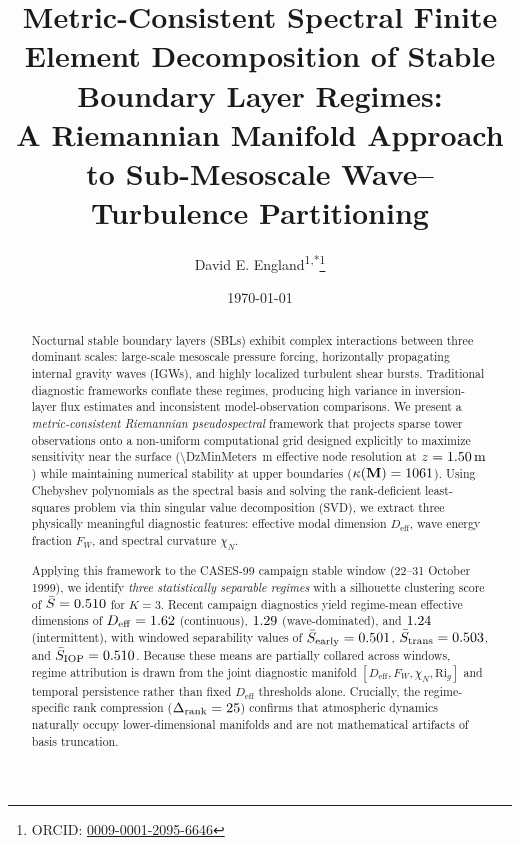 \documentclass[11pt,a4paper]{article}
\title{Metric-Consistent Spectral Finite Element Decomposition of Stable Boundary Layer Regimes: \\
A Riemannian Manifold Approach to Sub-Mesoscale Wave--Turbulence Partitioning}
\author{David E. England\textsuperscript{1,*}\thanks{ORCID: \href{https://orcid.org/0009-0001-2095-6646}{0009-0001-2095-6646}}}
\affil{\textsuperscript{1}The University of Alabama in Huntsville, 301 Sparkman Drive, Huntsville, AL 35899, USA}
\affil{\textsuperscript{*}Corresponding author: David.England@UAH.Edu}
\date{\today}
\begin{document}
\maketitle


\begin{abstract}
Nocturnal stable boundary layers (SBLs) exhibit complex interactions between three dominant scales: large-scale mesoscale pressure forcing, horizontally propagating internal gravity waves (IGWs), and highly localized turbulent shear bursts. Traditional diagnostic frameworks conflate these regimes, producing high variance in inversion-layer flux estimates and inconsistent model-observation comparisons. We present a \emph{metric-consistent Riemannian pseudospectral} framework that projects sparse tower observations onto a non-uniform computational grid designed explicitly to maximize sensitivity near the surface (\SI{\DzMinMeters}{\meter} effective node resolution at $z = \SI{1.50}{\meter}$) while maintaining numerical stability at upper boundaries ($\kappa(\mathbf{M}) = 1061$). Using Chebyshev polynomials as the spectral basis and solving the rank-deficient least-squares problem via thin singular value decomposition (SVD), we extract three physically meaningful diagnostic features: effective modal dimension $D_{\mathrm{eff}}$, wave energy fraction $F_W$, and spectral curvature $\chi_N$.

Applying this framework to the CASES-99 campaign stable window (22--31 October 1999), we identify \emph{three statistically separable regimes} with a silhouette clustering score of $\bar{S} = 0.510$ for $K=3$. Recent campaign diagnostics yield regime-mean effective dimensions of $D_{\mathrm{eff}}=1.62$ (continuous), $1.29$ (wave-dominated), and $1.24$ (intermittent), with windowed separability values of $\bar{S}_{\mathrm{early}}=0.501$, $\bar{S}_{\mathrm{trans}}=0.503$, and $\bar{S}_{\mathrm{IOP}}=0.510$. Because these means are partially collared across windows, regime attribution is drawn from the joint diagnostic manifold $[D_{\mathrm{eff}}, F_W, \chi_N, \mathrm{Ri}_g]$ and temporal persistence rather than fixed $D_{\mathrm{eff}}$ thresholds alone. Crucially, the regime-specific rank compression ($\Delta_{\mathrm{rank}} = 25$) confirms that atmospheric dynamics naturally occupy lower-dimensional manifolds and are not mathematical artifacts of basis truncation.


\end{abstract}
\end{document}
